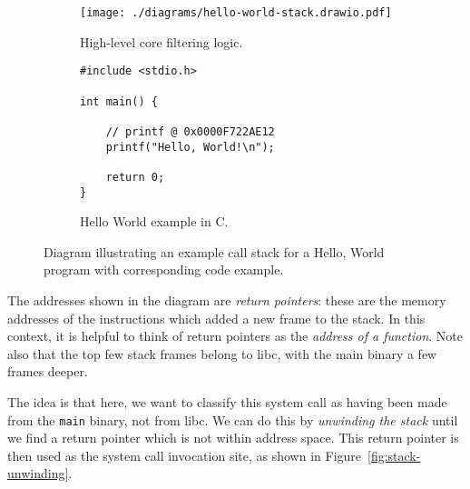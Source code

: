 \begin{figure}[h]
    \centering %

    \begin{subfigure}[b]{0.48\linewidth} %
        \centering %
        \texttt{[image: ./diagrams/hello-world-stack.drawio.pdf]}
        \caption{High-level \afg core filtering logic.} 
        \label{subfig:stack-diagram} %
    \end{subfigure}
    \hfill %
    \begin{subfigure}[b]{0.48\linewidth} %
        \centering %
        \begin{verbatim}
#include <stdio.h>

int main() {

    // printf @ 0x0000F722AE12
    printf("Hello, World!\n");    

    return 0;
}
        \end{verbatim}
        \caption{Hello World example in C.} %
        \label{subfig:hello-world-code} %
    \end{subfigure}

    \caption{Diagram illustrating an example call stack for a Hello, World
    program with corresponding code example.}%
    \label{fig:hello-world-stack} %

\end{figure}

The addresses shown in the diagram are \textit{return pointers}: these are the
memory addresses of the instructions which added a new frame to the stack. In this
context, it is helpful to think of return pointers as the \textit{address of a
function}. Note also that the top few stack frames belong to \ac{libc}, with
the main binary a few frames deeper.

The idea is that here, we want to classify this system call as having been made from
the \texttt{main} binary, not from \ac{libc}. We can do this by
\textit{unwinding the stack} until we find a return pointer which is not within
 address space. This return pointer is then used as the system call
invocation site, as shown in Figure~\ref{fig:stack-unwinding}.

